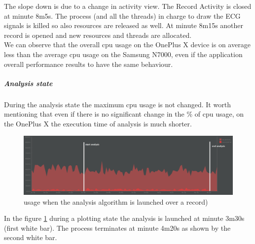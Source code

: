 The slope down is due to a change in activity view. The Record Activity is closed at minute 8m5s. The process (and all the threads)  in charge to draw the ECG signals is killed so also resources are released as well. At minute 8m15s another record is opened and new resources and threads  are allocated.\\
We can observe that the overall cpu usage on the OnePlus X device is on average less than the average cpu usage on the Samsung N7000, even if the application overall performance results to have the same behaviour.
\subparagraph{Analysis state}
During the analysis state the maximum cpu usage is not changed. It worth mentioning that even if there is no significant change in the \% of cpu usage, on the OnePlus X the execution time of analysis is much shorter.
\begin{figure}[h!]
	\centering	
	\includegraphics[width=1\linewidth]{figures/ch10/34.png}
	\caption{usage when the  analysis algorithm is launched over a record)}  
	\label{fig10.34}
\end{figure}
In the figure \ref{fig10.34} during a plotting state the analysis is launched at minute 3m30s (first white bar). The process terminates at minute 4m20s as shown by the second white bar.
